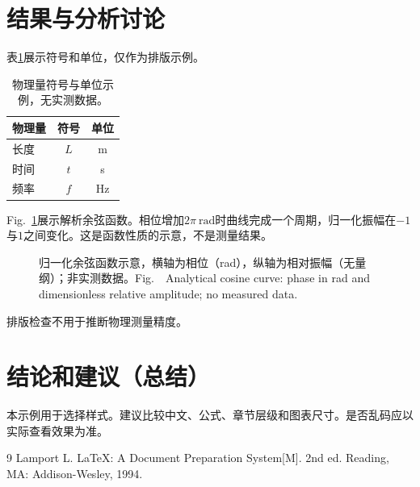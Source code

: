 \section{结果与分析讨论}
表\ref{tab:symbols}展示符号和单位，仅作为排版示例。
\begin{table}[H]
  \centering\small
  \caption{物理量符号与单位示例，无实测数据。}
  \label{tab:symbols}
  \begin{tabularx}{\linewidth}{Xcc}
    \toprule
    物理量 & 符号 & 单位\\
    \midrule
    长度 & $L$ & \si{\metre}\\
    时间 & $t$ & \si{\second}\\
    频率 & $f$ & \si{\hertz}\\
    \bottomrule
  \end{tabularx}
\end{table}
Fig.~\ref{fig:example}展示解析余弦函数。相位增加$2\pi~\si{\radian}$时曲线完成一个周期，归一化振幅在$-1$与$1$之间变化。这是函数性质的示意，不是测量结果。
\begin{figure}[H]
  \centering
  \newlength{\MVPDiagramWidth}
  \ifdim\linewidth>11cm\setlength{\MVPDiagramWidth}{0.65\linewidth}%
  \else\setlength{\MVPDiagramWidth}{0.9\linewidth}\fi
  \caption{归一化余弦函数示意，横轴为相位（rad），纵轴为相对振幅（无量纲）；非实测数据。\newline\small Fig.~\thefigure\ Analytical cosine curve: phase in rad and dimensionless relative amplitude; no measured data.}
  \label{fig:example}
\end{figure}
排版检查不用于推断物理测量精度。

\section{结论和建议（总结）}
本示例用于选择样式。建议比较中文、公式、章节层级和图表尺寸。是否乱码应以实际查看效果为准。

\renewcommand{\refname}{六、参考文献}
\begin{thebibliography}{9}
   Lamport L. LaTeX: A Document Preparation System[M]. 2nd ed. Reading, MA: Addison-Wesley, 1994.
\end{thebibliography}
